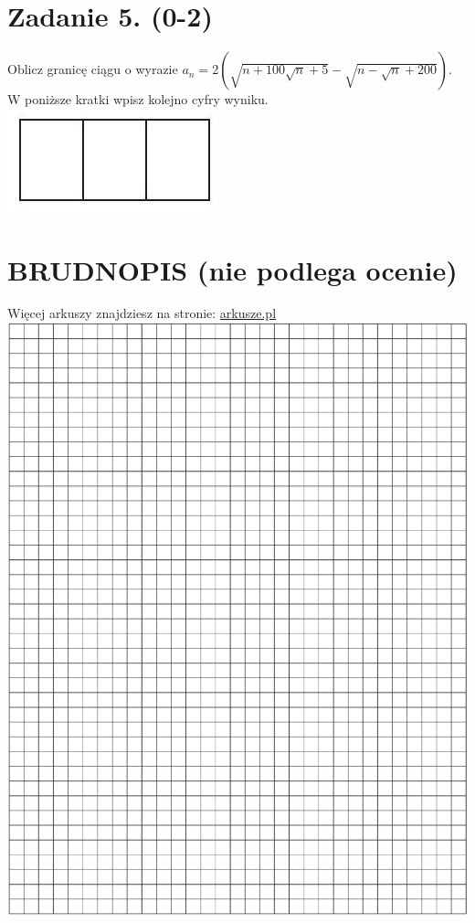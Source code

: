 \documentclass[10pt]{article}
\begin{document}
\section*{Zadanie 5. (0-2)}
Oblicz granicę ciągu o wyrazie \(a_{n}=2(\sqrt{n+100 \sqrt{n}+5}-\sqrt{n-\sqrt{n}+200})\).\\
W poniższe kratki wpisz kolejno cyfry wyniku.\\
\includegraphics[max width=\textwidth, center]{2024_11_21_5abc0108fbbc287103ecg-02}

\section*{BRUDNOPIS (nie podlega ocenie)}
Więcej arkuszy znajdziesz na stronie: \href{http://arkusze.pl}{arkusze.pl}\\
\includegraphics[max width=\textwidth, center]{2024_11_21_5abc0108fbbc287103ecg-03}
\end{document}
